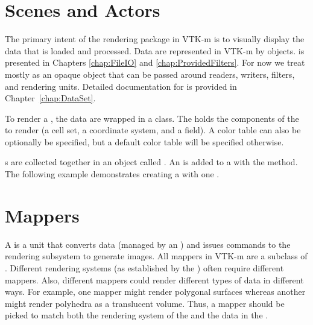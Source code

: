 \section{Scenes and Actors}
\label{sec:Scene}
\label{sec:Actor}


The primary intent of the rendering package in VTK-m is to visually display
the data that is loaded and processed. Data are represented in VTK-m by
 objects.  is presented in
Chapters \ref{chap:FileIO} and \ref{chap:ProvidedFilters}. For now we treat
 mostly as an opaque object that can be passed
around readers, writers, filters, and rendering units. Detailed
documentation for  is provided in
Chapter~\ref{chap:DataSet}.

To render a , the data are wrapped in a
 class. The  holds the
components of the  to render (a cell set, a
coordinate system, and a field). A color table can also be optionally be
specified, but a default color table will be specified otherwise.



s are collected together in an object called
. An  is added to a
 with the  method. The following
example demonstrates creating a  with one
.




\section{Mappers}
\label{sec:Mapper}


A  is a unit that converts data (managed by an
) and issues commands to the rendering subsystem to
generate images. All mappers in VTK-m are a subclass of
. Different rendering systems (as established by the
) often require different mappers. Also, different
mappers could render different types of data in different ways. For
example, one mapper might render polygonal surfaces whereas another might
render polyhedra as a translucent volume. Thus, a mapper should be picked
to match both the rendering system of the  and the
data in the .

